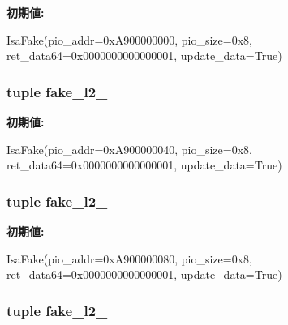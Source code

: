 \label{classT1000_1_1T1000_a385271574ece269aa9f1c5cb030eb30c}
{\bfseries 初期値:}
\begin{DoxyCode}
IsaFake(pio_addr=0xA900000000, pio_size=0x8,
            ret_data64=0x0000000000000001, update_data=True)
\end{DoxyCode}
\hypertarget{classT1000_1_1T1000_a47fc635cf3e601b8e234f4de3d2a6182}{
\subsubsection[{fake\_\-l2\_\-2}]{\setlength{\rightskip}{0pt plus 5cm}tuple {\bf fake\_\-l2\_}}}
\label{classT1000_1_1T1000_a47fc635cf3e601b8e234f4de3d2a6182}
{\bfseries 初期値:}
\begin{DoxyCode}
IsaFake(pio_addr=0xA900000040, pio_size=0x8,
            ret_data64=0x0000000000000001, update_data=True)
\end{DoxyCode}
\hypertarget{classT1000_1_1T1000_abf537b9af546117b014da0e94a6df49f}{
\subsubsection[{fake\_\-l2\_\-3}]{\setlength{\rightskip}{0pt plus 5cm}tuple {\bf fake\_\-l2\_}}}
\label{classT1000_1_1T1000_abf537b9af546117b014da0e94a6df49f}
{\bfseries 初期値:}
\begin{DoxyCode}
IsaFake(pio_addr=0xA900000080, pio_size=0x8,
            ret_data64=0x0000000000000001, update_data=True)
\end{DoxyCode}
\hypertarget{classT1000_1_1T1000_ad24d51d2884ce9ae204b4c0cfc8c70f4}{
\subsubsection[{fake\_\-l2\_\-4}]{\setlength{\rightskip}{0pt plus 5cm}tuple {\bf fake\_\-l2\_}}}
\label{classT1000_1_1T1000_ad24d51d2884ce9ae204b4c0cfc8c70f4}
